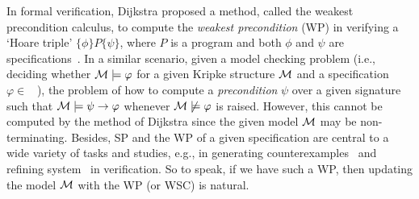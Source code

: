 \documentclass[twoside,11pt]{article}
\begin{document}
In formal verification, Dijkstra proposed a method, called the weakest precondition calculus, to compute the \emph{weakest precondition}
(WP) in verifying a `Hoare triple' $\{\phi\} P \{\psi\}$, where $P$ is a program and both $\phi$ and $\psi$ are specifications~\cite{DBLP:journals/cacm/Dijkstra75}.
In a similar scenario,  given a model checking problem (i.e., deciding whether ${\cal M} \models \varphi$ for a given Kripke structure ${\cal M}$ and a specification $\varphi\in$ \CTL\ ), the problem of how to compute a \emph{precondition} $\psi$ over a given signature such that ${\cal M} \models \psi \rightarrow \varphi$ whenever ${\cal M} \not \models \varphi$ is raised.
However, this cannot be computed by the method of Dijkstra since the given model ${\cal M}$ may be non-terminating.
Besides,  SP and the WP of a given specification are central to a wide variety of tasks and studies, e.g., in generating counterexamples~\cite{dailler2018instrumenting} and refining system~\cite{woodcock1990refinement} in verification.
So to speak, if we have such a WP, then updating the model ${\cal M}$ with the WP (or WSC) is natural.


\end{document}
